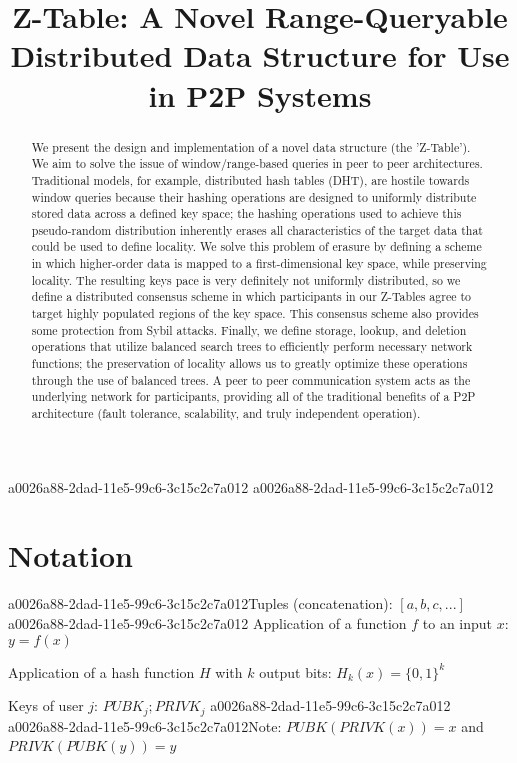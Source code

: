 \documentclass[12pt]{article}
\title{Z-Table: A Novel Range-Queryable Distributed Data Structure for Use in P2P Systems}
\begin{document}
a0026a88-2dad-11e5-99c6-3c15c2c7a012
a0026a88-2dad-11e5-99c6-3c15c2c7a012\maketitle

\begin{abstract}
We present the design and implementation of a novel data structure (the 'Z-Table'). We aim to solve the issue of window/range-based queries in peer to peer architectures. Traditional models, for example,  distributed hash tables (DHT), are hostile towards window queries because their hashing operations are designed to uniformly distribute stored data across a defined key space; the hashing operations used to achieve this pseudo-random distribution inherently erases all characteristics of the target data that could be used to define locality. We solve this problem of erasure by defining a scheme in which higher-order data is mapped to a first-dimensional key space, while preserving locality. The resulting keys pace is very definitely not uniformly distributed, so we define a distributed consensus scheme in which participants in our Z-Tables agree to target highly populated regions of the key space. This consensus scheme also provides some protection from Sybil attacks. Finally, we define storage, lookup, and deletion operations that utilize balanced search trees to efficiently perform necessary network functions; the preservation of locality allows us to greatly optimize these operations through the use of balanced trees. A peer to peer communication system acts as the underlying network for participants, providing all of the traditional benefits of a P2P architecture (fault tolerance, scalability, and truly independent operation).
\end{abstract}

\section{Notation}

a0026a88-2dad-11e5-99c6-3c15c2c7a012Tuples (concatenation): $[a,b,c,...]$
a0026a88-2dad-11e5-99c6-3c15c2c7a012
Application of a function $f$ to an input $x$: $y=f(x)$

Application of a hash function $H$ with $k$ output bits: $H_{k}(x) = \{0,1\}^k$

Keys of user $j$: $ PUBK_j; PRIVK_j $
a0026a88-2dad-11e5-99c6-3c15c2c7a012
a0026a88-2dad-11e5-99c6-3c15c2c7a012Note: $PUBK(PRIVK(x)) = x$ and $PRIVK(PUBK(y)) = y$~
\end{document}
